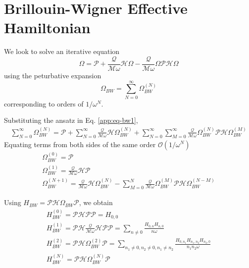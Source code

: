 \chapter{Brillouin-Wigner Effective Hamiltonian}
We look to solve an iterative equation
\begin{equation}
 \label{app:eq-bw1}\Omega = \mathcal{P} + \frac{\mathcal{Q}}{\mathcal{M}\omega}\mathcal{H}\Omega - \frac{\mathcal{Q}}{\mathcal{M}\omega}\Omega\mathcal{P}\mathcal{H}\Omega
\end{equation}
using the peturbative expansion
\begin{equation}
 \Omega_{BW} = \sum_{N=0}^{\infty}\Omega_{BW}^{(N)}
\end{equation} corresponding to orders of $1/\omega^N$.

Substituting the ansatz in Eq. \eqref{app:eq-bw1},
\begin{equation}
  \begin{split}
    \sum_{N=0}^{\infty}\Omega_{BW}^{(N)} = \mathcal{P} + \sum_{N=0}^{\infty}\frac{\mathcal{Q}}{\mathcal{M}\omega}\mathcal{H}\Omega_{BW}^{(N)}
    + \sum_{N=0}^{\infty}\sum_{M=0}^{\infty}\frac{\mathcal{Q}}{\mathcal{M}\omega}\Omega_{BW}^{(N)}\mathcal{P}\mathcal{H}\Omega_{BW}^{(M)}
  \end{split}
\end{equation}
Equating terms from both sides of the same order $\mathcal{O}(1/\omega^N)$
\begin{gather}
 \Omega_{BW}^{(0)} = \mathcal{P} \\
 \Omega_{BW}^{(1)} = \frac{\mathcal{Q}}{\mathcal{M}\omega}\mathcal{H}\mathcal{P} \\
 \Omega_{BW}^{(N+1)} = \frac{\mathcal{Q}}{\mathcal{M}\omega}\mathcal{H}\Omega_{BW}^{(N)} - \sum_{M=0}^{N}\frac{\mathcal{Q}}{\mathcal{M}\omega}\Omega_{BW}^{(M)}\mathcal{P}\mathcal{H}\Omega_{BW}^{(N-M)}
\end{gather}

Using $H_{BW} = \mathcal{P}\mathcal{H}\Omega_{BW}\mathcal{P}$, we obtain
\begin{gather}
 H_{BW}^{(0)} = \mathcal{P}\mathcal{H}\mathcal{P}\mathcal{P} = H_{0,0} \\
 H_{BW}^{(1)} = \mathcal{P}\mathcal{H}\frac{\mathcal{Q}}{\mathcal{M}\omega}\mathcal{H}\mathcal{P}\mathcal{P} = \sum_{n \neq 0} \frac{H_{0,n}H_{n,0}}{n\omega} \\
 H_{BW}^{(2)} = \mathcal{P}\mathcal{H}\Omega_{BW}^{(2)}\mathcal{P} = \sum_{n_1 \neq 0, n_2 \neq 0, n_1\neq n_2} \frac{H_{0,n_1}H_{n_1,n_2}H_{n_2,0}}{n_1 n_2 \omega} \\
 H_{BW}^{(N)} = \mathcal{P}\mathcal{H}\Omega_{BW}^{(N)}\mathcal{P}
\end{gather}